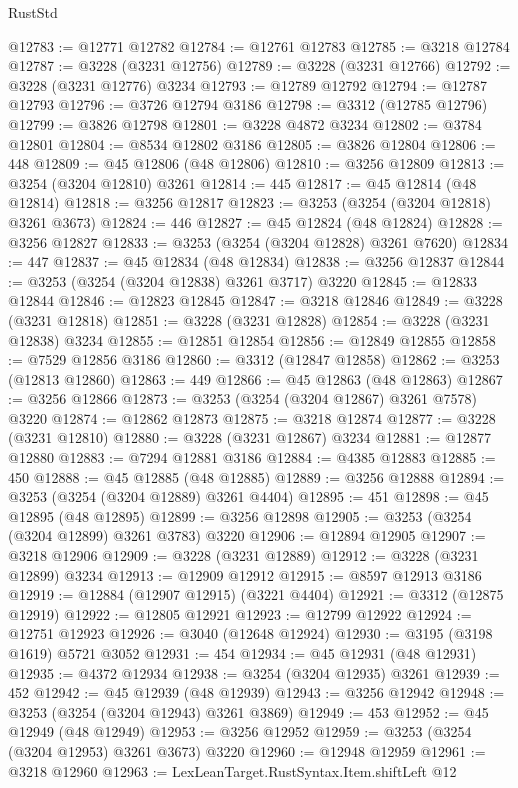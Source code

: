 \begin{lexlean}{RustStd}
\begin{coremodule}
@12783 := @12771 @12782
@12784 := @12761 @12783
@12785 := @3218 @12784
@12787 := @3228 (@3231 @12756)
@12789 := @3228 (@3231 @12766)
@12792 := @3228 (@3231 @12776) @3234
@12793 := @12789 @12792
@12794 := @12787 @12793
@12796 := @3726 @12794 @3186
@12798 := @3312 (@12785 @12796)
@12799 := @3826 @12798
@12801 := @3228 @4872 @3234
@12802 := @3784 @12801
@12804 := @8534 @12802 @3186
@12805 := @3826 @12804
@12806 := 448
@12809 := @45 @12806 (@48 @12806)
@12810 := @3256 @12809
@12813 := @3254 (@3204 @12810) @3261
@12814 := 445
@12817 := @45 @12814 (@48 @12814)
@12818 := @3256 @12817
@12823 := @3253 (@3254 (@3204 @12818) @3261 @3673)
@12824 := 446
@12827 := @45 @12824 (@48 @12824)
@12828 := @3256 @12827
@12833 := @3253 (@3254 (@3204 @12828) @3261 @7620)
@12834 := 447
@12837 := @45 @12834 (@48 @12834)
@12838 := @3256 @12837
@12844 := @3253 (@3254 (@3204 @12838) @3261 @3717) @3220
@12845 := @12833 @12844
@12846 := @12823 @12845
@12847 := @3218 @12846
@12849 := @3228 (@3231 @12818)
@12851 := @3228 (@3231 @12828)
@12854 := @3228 (@3231 @12838) @3234
@12855 := @12851 @12854
@12856 := @12849 @12855
@12858 := @7529 @12856 @3186
@12860 := @3312 (@12847 @12858)
@12862 := @3253 (@12813 @12860)
@12863 := 449
@12866 := @45 @12863 (@48 @12863)
@12867 := @3256 @12866
@12873 := @3253 (@3254 (@3204 @12867) @3261 @7578) @3220
@12874 := @12862 @12873
@12875 := @3218 @12874
@12877 := @3228 (@3231 @12810)
@12880 := @3228 (@3231 @12867) @3234
@12881 := @12877 @12880
@12883 := @7294 @12881 @3186
@12884 := @4385 @12883
@12885 := 450
@12888 := @45 @12885 (@48 @12885)
@12889 := @3256 @12888
@12894 := @3253 (@3254 (@3204 @12889) @3261 @4404)
@12895 := 451
@12898 := @45 @12895 (@48 @12895)
@12899 := @3256 @12898
@12905 := @3253 (@3254 (@3204 @12899) @3261 @3783) @3220
@12906 := @12894 @12905
@12907 := @3218 @12906
@12909 := @3228 (@3231 @12889)
@12912 := @3228 (@3231 @12899) @3234
@12913 := @12909 @12912
@12915 := @8597 @12913 @3186
@12919 := @12884 (@12907 @12915) (@3221 @4404)
@12921 := @3312 (@12875 @12919)
@12922 := @12805 @12921
@12923 := @12799 @12922
@12924 := @12751 @12923
@12926 := @3040 (@12648 @12924)
@12930 := @3195 (@3198 @1619) @5721 @3052
@12931 := 454
@12934 := @45 @12931 (@48 @12931)
@12935 := @4372 @12934
@12938 := @3254 (@3204 @12935) @3261
@12939 := 452
@12942 := @45 @12939 (@48 @12939)
@12943 := @3256 @12942
@12948 := @3253 (@3254 (@3204 @12943) @3261 @3869)
@12949 := 453
@12952 := @45 @12949 (@48 @12949)
@12953 := @3256 @12952
@12959 := @3253 (@3254 (@3204 @12953) @3261 @3673) @3220
@12960 := @12948 @12959
@12961 := @3218 @12960
@12963 := LexLeanTarget.RustSyntax.Item.shiftLeft @12

\end{coremodule}
\end{lexlean}
